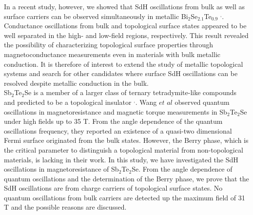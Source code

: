 \documentclass[aps,prb,twocolumn,showpacs,groupedaddress]{revtex4-1}
\begin{document}
\indent In a recent study, however, we showed that SdH oscillations from bulk as well as surface carriers can be observed simultaneously in metallic Bi$_2$Se$_{2.1}$Te$_{0.9}$ \cite{Shrestha:15}$^,$\cite{Shrestha1:16}. Conductance oscillations from bulk and topological surface states appeared to be well separated in the high- and low-field regions, respectively. This result revealed the possibility of characterizing topological surface properties through magnetoconductance measurements even in materials with bulk metallic conduction. It is therefore of interest to extend the study of metallic topological systems and search for other candidates
where surface SdH oscillations can be resolved despite metallic conduction in the bulk.\\
\indent Sb$_2$Te$_2$Se is a member of a larger class of ternary tetradymite-like compounds \cite{Xu:17} and predicted to be a topological insulator \cite{Lin:18}$^,$\cite{Fu:20}. Wang $et$ $al$\cite{Wang:19} observed quantum oscillations in magnetoresistance and magnetic torque measurements in Sb$_2$Te$_2$Se under high fields up to 35 T. From the angle dependence of the quantum oscillations frequency, they reported an existence of a quasi-two dimensional Fermi surface originated from the bulk states. However, the Berry phase, which is the critical parameter to distinguish a topological material from non-topological materials, is lacking in their work. In this study, we have investigated the SdH oscillations in magnetoresistance of Sb$_2$Te$_2$Se. From the angle dependence of quantum oscillations and the determination of the Berry phase, we prove that the SdH oscillations are from charge carriers of topological surface states. No quantum oscillations from bulk carriers are detected up the maximum field of 31 T and the possible reasons are discussed.
\end{document}
